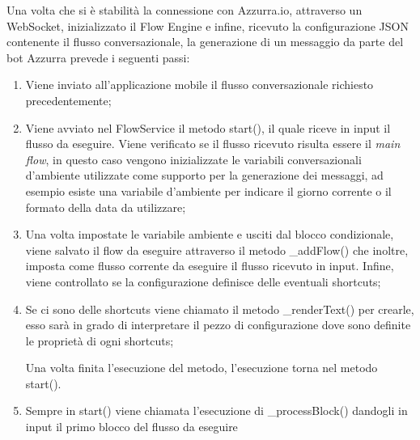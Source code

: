 Una volta che si è stabilità la connessione con Azzurra.io, attraverso un \gls{WebSocket}, inizializzato il Flow Engine e infine, ricevuto la configurazione JSON contenente il flusso conversazionale, la generazione di un messaggio da parte del bot Azzurra prevede i seguenti passi:\\
\begin{enumerate}
	\item Viene inviato all’applicazione mobile il flusso conversazionale richiesto precedentemente;
	\item Viene avviato nel FlowService il metodo start(), il quale riceve in input il flusso da eseguire. Viene verificato se il flusso ricevuto risulta essere il \emph{main flow}, in questo caso vengono inizializzate le variabili conversazionali d'ambiente utilizzate come supporto per la generazione dei messaggi, ad esempio esiste una variabile d'ambiente per indicare il giorno corrente o il formato della data da utilizzare;
	\item Una volta impostate le variabile ambiente e usciti dal blocco condizionale, viene salvato il flow da eseguire attraverso il metodo \_addFlow() che inoltre, imposta come flusso corrente da eseguire il flusso ricevuto in input. Infine, viene controllato se la configurazione definisce delle eventuali shortcuts;
	\item Se ci sono delle shortcuts viene chiamato il metodo \_renderText() per crearle, esso sarà in grado di interpretare il pezzo di configurazione dove sono definite le proprietà di ogni shortcuts;
	
	Una volta finita l'esecuzione del metodo, l'esecuzione torna nel metodo start().
	\item Sempre in start() viene chiamata l'esecuzione di \_processBlock() dandogli in input il primo blocco del flusso da eseguire
	

\end{enumerate}
